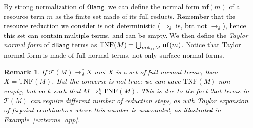 \documentclass[10pt,a4paper]{article}
\newtheorem{remark}[theorem]{Remark}
\newcommand{\<}{\langle}
\renewcommand{\>}{\rangle}
\newcommand{\dbang}{\ensuremath{\mathtt{dBang}}}
\newcommand{\dbangres}{\ensuremath{\mathtt{\delta Bang}}}
\newcommand{\nf}[1]{\mathbf{nf}(#1)}
\newcommand{\Todbr}{\Rightarrow_{\delta}} %
\newcommand{\todbrf}{\to_{\delta}} %
\newcommand{\app}{\triangleleft_\oc} %
\newcommand{\taylor}[1]{\ensuremath{\mathcal{T}(#1)}}
\newcommand{\taylornf}[1]{\ensuremath{\text{TNF}(#1)}}
\newcommand{\fnl}[1]{\textcolor{black}{#1}}
\newcommand{\nativeemdash}{\ifmmode\text{\textemdash}\else\textemdash\fi}
\begin{document}
By strong normalization of $\dbangres$, we can define the normal form $\nf m$ of a resource term $m$ as the finite set made of its full
reducts. \fnl{Remember that the resource reduction we consider is not
	deterministic ($\Todbr$ is, but not $\todbrf$), hence this
set can contain multiple terms, and can be empty.} We then define the \emph{Taylor normal
form} of \dbang{} terms as $\taylornf M =\bigcup_{m\app M}\nf m$. Notice that
Taylor normal form is made of full normal terms, not only surface normal forms.

\begin{remark}
	\fnl{If $\taylor M\Todbr^* X$ and $X$ is a set of full normal terms, than
		$X=\taylornf M$. But the converse is not true: we can have
		$\taylornf M$ non empty, but no $k$ such that $M\Todbr^k
		\taylornf M$. This is due to the fact that terms in $\taylor M$
		can require different number of reduction steps, as with Taylor
		expansion of fixpoint combinators where this number is unbounded,
		as illustrated in Example~\ref{ex:terms_app}.
	}
\end{remark}
\end{document}
